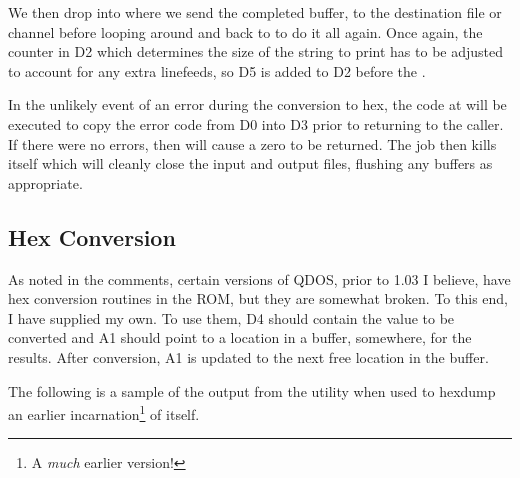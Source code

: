 We then drop into  where we send the completed buffer, to the destination file or channel before looping around and back to  to do it all again. Once again, the counter in D2 which determines the size of the string to print has to be adjusted to account for any extra linefeeds, so D5 is added to D2 before the .

In the unlikely event of an error during the conversion to hex, the code at  will be executed to copy the error code from D0 into D3 prior to returning to the caller. If there were no errors, then  will cause a zero to be returned. The job then kills itself which will cleanly close the input and output files, flushing any buffers as appropriate.

\subsection{Hex Conversion}

As noted in the comments, certain versions of QDOS, prior to 1.03 I believe, have hex conversion routines in the ROM, but they are somewhat broken. To this end, I have supplied my own. To use them, D4 should contain the value to be converted and A1 should point to a location in a buffer, somewhere, for the results. After conversion, A1 is updated to the next free location in the buffer.

The following is a sample of the output from the utility when used to hexdump an earlier incarnation\footnote{A \emph{much} earlier version!} of itself.

